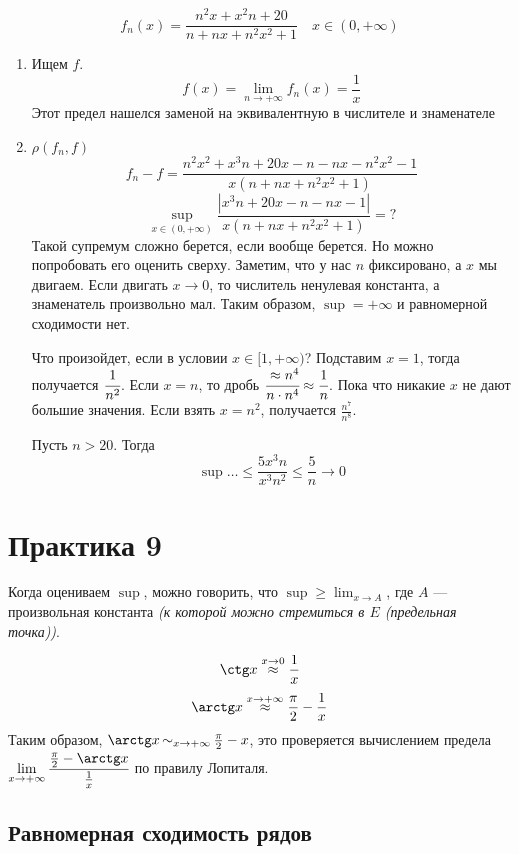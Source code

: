 \begin{exercise}
    \[f_n(x) = \frac{n^2x + x^2n + 20}{n + nx + n^2x^2 + 1} \quad x\in(0, +\infty) \]
    \begin{enumerate}
        \item Ищем \(f\).
              \[f(x) = \lim_{n\to +\infty} f_n(x) = \frac{1}{x}\]
              Этот предел нашелся заменой на эквивалентную в числителе и знаменателе
        \item \(\rho(f_n, f)\)
              \[f_n - f = \frac{n^2x^2 + x^3n + 20x - n - nx - n^2x^2 - 1}{x(n + nx + n^2x^2 + 1)}\]
              \[\sup_{x\in(0, +\infty)} \frac{|x^3n + 20x - n - nx - 1|}{x(n + nx + n^2x^2 + 1)} = ?\]
              Такой супремум сложно берется, если вообще берется. Но можно попробовать его оценить сверху. Заметим, что у нас \(n\) фиксировано, а \(x\) мы двигаем. Если двигать \(x\to 0\), то числитель ненулевая константа, а знаменатель произвольно мал. Таким образом, \(\sup = +\infty\) и равномерной сходимости нет.

              Что произойдет, если в условии \(x\in[1, +\infty)\)? Подставим \(x = 1\), тогда получается \(\cfrac{1}{n^2}\). Если \(x = n\), то дробь \(\cfrac{\approx n^4}{n\cdot n^4} \approx \cfrac{1}{n}\). Пока что никакие \(x\) не дают большие значения. Если взять \(x = n^2\), получается \(\frac{n^7}{n^8}\).

              Пусть \(n > 20\). Тогда
              \[\sup \dots \le \frac{5x^3 n}{x^3 n^2} \le \frac{5}{n} \to 0\]
    \end{enumerate}
\end{exercise}

\section*{Практика 9}

Когда оцениваем \(\sup\), можно говорить, что \(\sup \geq \lim_{x\to A}\), где \(A\) --- произвольная константа \textit{(к которой можно стремиться в \(E\) (предельная точка))}.

\[\ctg x \stackrel{x\to 0}\approx \frac{1}{x}\]
\[\arctg x \stackrel{x\to +\infty}{\approx} \frac{\pi}{2} - \frac{1}{x}\]
Таким образом, \(\arctg x \equ_{x\to +\infty} \frac{\pi}{2} - x\), это проверяется вычислением предела \(\lim\limits_{x\to +\infty} \cfrac{\frac{\pi}{2} -\arctg x}{\frac{1}{x}}\) по правилу Лопиталя.

\subsection*{Равномерная сходимость рядов}

